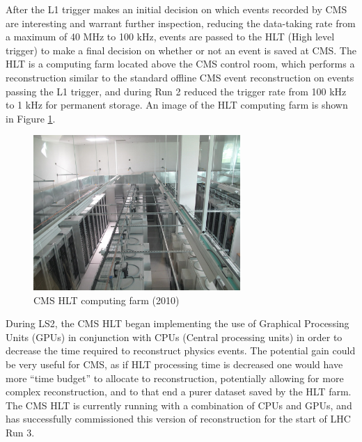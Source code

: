 
After the L1 trigger makes an initial decision on which events recorded by CMS are interesting and warrant further inspection, reducing the data-taking rate from a maximum of 40 MHz to 100 kHz, events are passed to the HLT (High level trigger) to make a final decision on whether or not an event is saved at CMS. The HLT is a computing farm located above the CMS control room, which performs a reconstruction similar to the standard offline CMS event reconstruction on events passing the L1 trigger, and during Run 2 reduced the trigger rate from 100 kHz to 1 kHz for permanent storage. An image of the HLT computing farm is shown in Figure \ref{fig:HLT_Farm}.

\begin{figure}[H]
    \centering
    \includegraphics[width=0.7\textwidth]{Images/CMS/CMS_HLT_Farm.jpg}
    \caption{CMS HLT computing farm (2010)} %
    \label{fig:HLT_Farm} %
\end{figure}

During LS2, the CMS HLT began implementing the use of Graphical Processing Units (GPUs) in conjunction with CPUs (Central processing units) in order to decrease the time required to reconstruct physics events. The potential gain could be very useful for CMS, as if HLT processing time is decreased one would have more ``time budget'' to allocate to reconstruction, potentially allowing for more complex reconstruction, and to that end a purer dataset saved by the HLT farm. The CMS HLT is currently running with a combination of CPUs and GPUs, and has successfully commissioned this version of reconstruction for the start of LHC Run 3. 